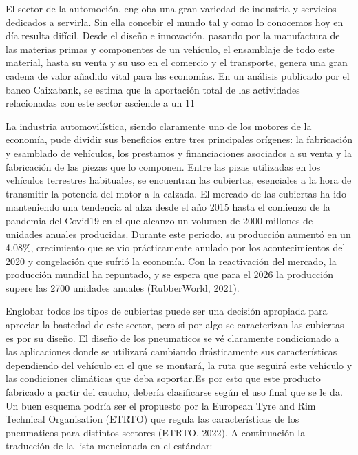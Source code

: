 \documentclass[12pt]{article}
\begin{document}
El sector de la automoción, engloba una gran variedad de industria y servicios dedicados a servirla. Sin ella concebir el mundo tal y como lo conocemos hoy en día resulta difícil. Desde el diseño e innovación, pasando por la manufactura de las materias primas y componentes de un vehículo, el ensamblaje de todo este material, hasta su venta y su uso en el comercio y el transporte, genera una gran cadena de valor añadido vital para las economías. En un análisis publicado por el banco Caixabank, se estima que la aportación total de las actividades relacionadas con este sector asciende a un 11%
 
La industria automovilística, siendo claramente uno de los motores de la economía, pude dividir sus beneficios entre tres principales orígenes: la fabricación y esamblado de vehículos, los prestamos y financiaciones asociados a su venta y la fabricación de las piezas que lo componen. Entre las pizas utilizadas en los vehículos terrestres habituales, se encuentran las cubiertas, esenciales a la hora de transmitir la potencia del motor a la calzada. El mercado de las cubiertas ha ido manteniendo una tendencia al alza desde el año 2015 hasta el comienzo de la pandemia del Covid19 en el que alcanzo un volumen de 2000 millones de unidades anuales producidas. Durante este periodo, su producción aumentó en un 4,08\%, crecimiento que se vio prácticamente anulado por los acontecimientos del 2020 y congelación que sufrió la economía. Con la reactivación del mercado, la producción mundial ha repuntado, y se espera que para el 2026 la producción supere las 2700 unidades anuales (RubberWorld, 2021).

Englobar todos los tipos de cubiertas puede ser una decisión apropiada para apreciar la bastedad de este sector, pero si por algo se caracterizan las cubiertas es por su diseño. El diseño de los pneumaticos se vé claramente condicionado a las aplicaciones donde se utilizará cambiando drásticamente sus características dependiendo del vehículo en el que se montará, la ruta que seguirá este vehículo y las condiciones climáticas que deba soportar.Es por esto que este producto fabricado a partir del caucho, debería clasificarse según el uso final que se le da. Un buen esquema podría ser el propuesto por la European Tyre and Rim Technical Organisation (ETRTO) que regula las características de los pneumaticos para distintos sectores (ETRTO, 2022). A continuación la traducción de la lista mencionada en el estándar:
\end{document}
